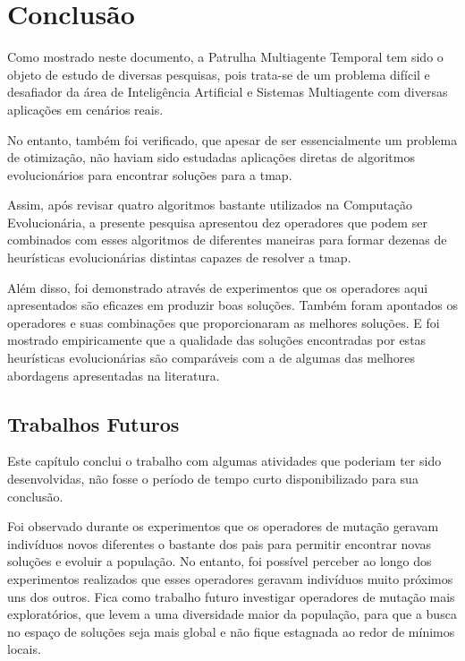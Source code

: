 \chapter{Conclusão}
\label{conclusao_final}

Como mostrado neste documento, a Patrulha Multiagente Temporal tem sido o objeto 
de estudo de diversas pesquisas, pois trata-se de um problema difícil e 
desafiador da área de Inteligência Artificial e Sistemas Multiagente com 
diversas aplicações em cenários reais.

No entanto, também foi verificado, que apesar de ser essencialmente um problema 
de otimização, não haviam sido estudadas aplicações diretas de algoritmos 
evolucionários para encontrar soluções para a \ac{tmap}.

Assim, após revisar quatro algoritmos bastante utilizados na Computação 
Evolucionária, a presente pesquisa apresentou dez operadores que podem ser 
combinados com esses algoritmos de diferentes maneiras para formar dezenas de 
heurísticas evolucionárias distintas capazes de resolver a \ac{tmap}.

Além disso, foi demonstrado através de experimentos que os operadores aqui 
apresentados são eficazes em produzir boas soluções. Também foram apontados 
os operadores e suas combinações que proporcionaram as melhores soluções. 
E foi mostrado empiricamente que a qualidade das soluções encontradas por estas 
heurísticas evolucionárias são comparáveis com a de algumas das melhores 
abordagens apresentadas na literatura.

\section{Trabalhos Futuros}

Este capítulo conclui o trabalho com algumas atividades que poderiam ter sido 
desenvolvidas, não fosse o período de tempo curto disponibilizado para sua 
conclusão.

Foi observado durante os experimentos que os operadores de mutação geravam 
indivíduos novos diferentes o bastante dos pais para permitir encontrar novas 
soluções e evoluir a população. No entanto, foi possível perceber ao longo dos 
experimentos realizados que esses operadores geravam indivíduos muito próximos 
uns dos outros. Fica como trabalho futuro investigar operadores de mutação mais 
exploratórios, que levem a uma diversidade maior da população, para que a busca 
no espaço de soluções seja mais global e não fique estagnada ao redor de mínimos 
locais.

